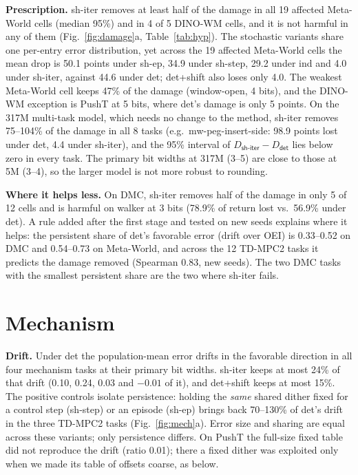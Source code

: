 \documentclass[conference]{IEEEtran}
\newcommand{\dtm}{\textsf{det}\xspace}
\newcommand{\shiter}{\textsf{sh-iter}\xspace}
\newcommand{\shstep}{\textsf{sh-step}\xspace}
\newcommand{\shep}{\textsf{sh-ep}\xspace}
\newcommand{\detshift}{\textsf{det+shift}\xspace}
\newcommand{\ind}{\textsf{ind}\xspace}
\begin{document}
\textbf{Prescription.} \shiter removes at least half of the damage in all 19 affected Meta-World cells (median 95\%) and in 4 of 5 DINO-WM cells, and it is not harmful in any of them (Fig.~\ref{fig:damage}a, Table~\ref{tab:hyp}). The stochastic variants share one per-entry error distribution, yet across the 19 affected Meta-World cells the mean drop is 50.1 points under \shep, 34.9 under \shstep, 29.2 under \ind and 4.0 under \shiter, against 44.6 under \dtm; \detshift also loses only 4.0. The weakest Meta-World cell keeps 47\% of the damage (window-open, 4 bits), and the DINO-WM exception is PushT at 5 bits, where \dtm's damage is only 5 points. On the 317M multi-task model, which needs no change to the method, \shiter removes 75--104\% of the damage in all 8 tasks (e.g.\ mw-peg-insert-side: 98.9 points lost under \dtm, 4.4 under \shiter), and the 95\% interval of $D_{\shiter}-D_{\dtm}$ lies below zero in every task. The primary bit widths at 317M (3--5) are close to those at 5M (3--4), so the larger model is not more robust to rounding.

\textbf{Where it helps less.} On DMC, \shiter removes half of the damage in only 5 of 12 cells and is harmful on walker at 3 bits (78.9\% of return lost vs.\ 56.9\% under \dtm). A rule added after the first stage and tested on new seeds explains where it helps: the persistent share of \dtm's favorable error (drift over OEI) is 0.33--0.52 on DMC and 0.54--0.73 on Meta-World, and across the 12 TD-MPC2 tasks it predicts the damage removed (Spearman 0.83, new seeds). The two DMC tasks with the smallest persistent share are the two where \shiter fails.

\section{Mechanism}
\label{sec:mech}

\textbf{Drift.} Under \dtm the population-mean error drifts in the favorable direction in all four mechanism tasks at their primary bit widths. \shiter keeps at most 24\% of that drift (0.10, 0.24, 0.03 and $-0.01$ of it), and \detshift keeps at most 15\%. The positive controls isolate persistence: holding the \emph{same} shared dither fixed for a control step (\shstep) or an episode (\shep) brings back 70--130\% of \dtm's drift in the three TD-MPC2 tasks (Fig.~\ref{fig:mech}a). Error size and sharing are equal across these variants; only persistence differs. On PushT the full-size fixed table did not reproduce the drift (ratio 0.01); there a fixed dither was exploited only when we made its table of offsets coarse, as below.
\end{document}
